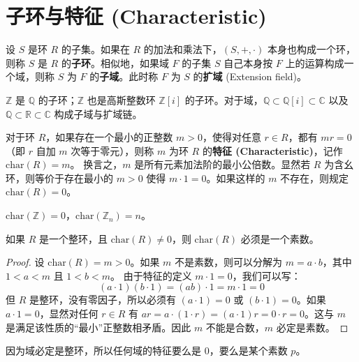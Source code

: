 \documentclass[11pt]{article}
\begin{document}
\section{子环与特征 (Characteristic)}

\begin{cndefinition}[子环与子域]
设 $S$ 是环 $R$ 的子集。如果在 $R$ 的加法和乘法下，$(S, +, \cdot)$ 本身也构成一个环，则称 $S$ 是 $R$ 的\textbf{子环}。相似地，如果域 $F$ 的子集 $S$ 自己本身按 $F$ 上的运算构成一个域，则称 $S$ 为 $F$ 的\textbf{子域}。此时称 $F$ 为 $S$ 的\textbf{扩域} (Extension field)。
\end{cndefinition}
\begin{cnexample}
$\mathbb{Z}$ 是 $\mathbb{Q}$ 的子环；$\mathbb{Z}$ 也是高斯整数环 $\mathbb{Z}[i]$ 的子环。对于域，$\mathbb{Q} \subset \mathbb{Q}[i] \subset \mathbb{C}$ 以及 $\mathbb{Q} \subset \mathbb{R} \subset \mathbb{C}$ 构成子域与扩域链。
\end{cnexample}

\begin{cndefinition}[环的特征]
对于环 $R$，如果存在一个最小的正整数 $m > 0$，使得对任意 $r \in R$，都有 $mr = 0$（即 $r$ 自加 $m$ 次等于零元），则称 $m$ 为环 $R$ 的\textbf{特征 (Characteristic)}，记作 $\text{char}(R) = m$。
换言之，$m$ 是所有元素加法阶的最小公倍数。显然若 $R$ 为含幺环，则等价于存在最小的 $m>0$ 使得 $m \cdot 1 = 0$。如果这样的 $m$ 不存在，则规定 $\text{char}(R) = 0$。
\end{cndefinition}
\begin{cnexample}
$\text{char}(\mathbb{Z}) = 0$，$\text{char}(\mathbb{Z}_n) = n$。
\end{cnexample}

\begin{cntheorem}
如果 $R$ 是一个整环，且 $\text{char}(R) \neq 0$，则 $\text{char}(R)$ 必须是一个素数。
\end{cntheorem}
\begin{proof}
设 $\text{char}(R) = m > 0$。如果 $m$ 不是素数，则可以分解为 $m = a \cdot b$，其中 $1 < a < m$ 且 $1 < b < m$。
由于特征的定义 $m \cdot 1 = 0$，我们可以写：
$$(a \cdot 1)(b \cdot 1) = (ab) \cdot 1 = m \cdot 1 = 0$$
但 $R$ 是整环，没有零因子，所以必须有 $(a \cdot 1) = 0$ 或 $(b \cdot 1) = 0$。如果 $a \cdot 1 = 0$，显然对任何 $r \in R$ 有 $ar = a \cdot (1 \cdot r) = (a \cdot 1)r = 0 \cdot r = 0$。这与 $m$ 是满足该性质的“最小”正整数相矛盾。因此 $m$ 不能是合数，$m$ 必定是素数。
\end{proof}

\begin{cncorollary}
因为域必定是整环，所以任何域的特征要么是 $0$，要么是某个素数 $p$。
\end{cncorollary}
\end{document}
